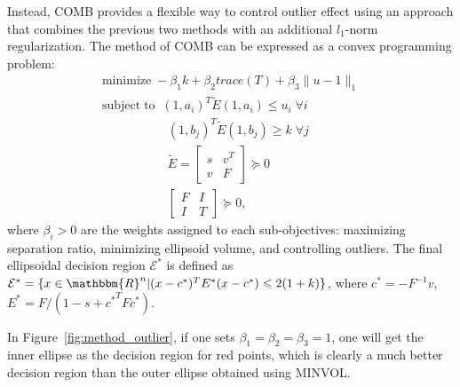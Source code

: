 \documentclass{scrartcl}
\begin{document}
\par
Instead, COMB provides a flexible way to control outlier effect using an
approach that combines the previous two methods with an additional $l_1$-norm
regularization.
The method of COMB can be expressed as a convex programming problem:
\begin{gather*}
    \mathrm{minimize}\;-{\beta_{1}}k+{\beta_{2}} trace(T)+\beta_{3} \|u-1\|_1 \\  
    \mathrm{subject\;to}\;\;
    (1,a_i)^T\tilde{E}(1,a_i)\leqslant u_i \; \forall i \\
    \;\;\;\;\;\;\;\;\;\;\;\;\;\;\;\;\;\;\;
    (1,b_j)^T\tilde{E}(1,b_j) \ge k \; \forall j \\
    \;\;\;\;\;\;\;\;\;\;\;\;\;\;\;\;\;\;\;
    \tilde{E}=
    \left[
        \begin{array}{cc}
            s & v^T \\
            v & F
        \end{array}
    \right] \succeq 0 \\
    \;\;\;\;\;\;\;\;\;\;\;\;\;\;\;\;\;\;\;
    \left[
        \begin{array}{cc}
            F & I \\
            I & T
        \end{array}
    \right] \succeq 0,
\end{gather*}
where $\beta_{i} > 0$ are the weights assigned to each sub-objectives:
maximizing separation ratio, minimizing ellipsoid volume, and controlling
outliers.
The final ellipsoidal decision region $\mathcal{E}^{*}$ is defined as
$\mathcal{E}^{*}=
\{x \in \mathbbm{R}^{n} | (x-c^{*})^TE^{*}(x-c^{*})\leqslant2(1+k)\}$,
where
$c^{*}=-F^{-1}v$, $E^{*}=F/(1-s+{c^{*}}^TF{c^{*}})$.

\par
In Figure~\ref{fig:method_outlier}, if one sets
$\beta_{1}=\beta_{2}=\beta_{3}=1$, one will get the inner ellipse as the
decision region for red points, which is clearly a much better decision region
than the outer ellipse obtained using MINVOL.
\end{document}
